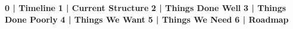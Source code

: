 \documentclass[12pt , letterpaper]{article}
\begin{document}
\begin{titlepage}
    \begin{center} \Large {}  \end{center}
\end{titlepage}

\tableofcontents

{\bfseries 0 | Timeline} \newline
{\bfseries 1 | Current Structure} \newline 
{\bfseries 2 | Things Done Well} \newline
{\bfseries 3 | Things Done Poorly} \newline
{\bfseries 4 | Things We Want} \newline
{\bfseries 5 | Things We Need} \newline
{\bfseries 6 | Roadmap} \newline
\end{document}
